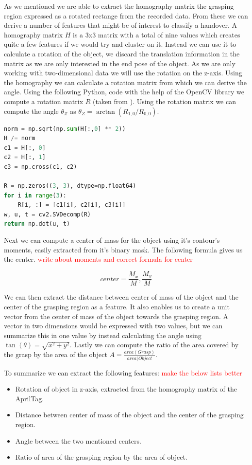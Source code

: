 As we mentioned we are able to extract the homography matrix the grasping region expressed as a rotated rectange from the recorded data. From these we can derive a number of features that might be of interest to classify a handover. A homography matrix \(H\) is a 3x3 matrix with a total of nine values which creates quite a few features if we would try and cluster on it. Instead we can use it to calculate a rotation of the object, we discard the translation information in the matrix as we are only interested in the end pose of the object. As we are only working with two-dimensional data we will use the rotation on the z-axis. Using the homography we can calculate a rotation matrix from which we can derive the angle. Using the following Python, code with the help of the OpenCV library we compute a rotation matrix \(R\) (taken from \parencite{OpenCVHomographyDemo}). Using the rotation matrix we can compute the angle \(\theta_Z\) as \(\theta_Z = \arctan(R_{1,0} / R_{0,0})\).

\begin{lstlisting}[language=Python]
norm = np.sqrt(np.sum(H[:,0] ** 2))
H /= norm
c1 = H[:, 0]
c2 = H[:, 1]
c3 = np.cross(c1, c2)

R = np.zeros((3, 3), dtype=np.float64)
for i in range(3):
	R[i, :] = [c1[i], c2[i], c3[i]]
w, u, t = cv2.SVDecomp(R)
return np.dot(u, t)
\end{lstlisting}

Next we can compute a center of mass for the object using it's contour's moments, easily extracted from it's binary mask. The following formula gives us the center. \textcolor{red}{write about moments and correct formula for center}

\[
	center = \frac{M_x}{M}, \frac{M_y}{M}
\]

We can then extract the distance between center of mass of the object and the center of the grasping region as a feature. It also enables us to create a unit vector from the center of mass of the object towards the grasping region. A vector in two dimensions would be expressed with two values, but we can summarize this in one value by instead calculating the angle using \(\tan(\theta) = \sqrt{x^2 + y^2}\). Lastly we can compute the ratio of the area covered by the grasp by the area of the object \(A = \frac{area(Grasp)}{area(Object}\).

To summarize we can extract the following features: \textcolor{red}{make the below lists better}
\begin{itemize}
	\item Rotation of object in z-axis, extracted from the homography matrix of the AprilTag.
	\item Distance between center of mass of the object and the center of the grasping region.
	\item Angle between the two mentioned centers.
	\item Ratio of area of the grasping region by the area of object.
\end{itemize}

